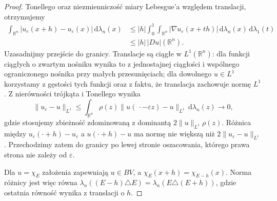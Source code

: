 \begin{proof}
Tonellego oraz niezmienniczość miary Lebesgue'a
względem translacji, otrzymujemy
\begin{align*}
 \int_{\mathbb R^n}|u_\varepsilon(x+h)-u_\varepsilon(x)|
 \,\mathrm d\lambda_n(x)
 &\le |h|\int_0^1\int_{\mathbb R^n}
 |\nabla u_\varepsilon(x+th)|\,\mathrm d\lambda_n(x)
 \,\mathrm d\lambda_1(t)\\
 &\le |h|\,|Du|(\mathbb R^n).
\end{align*}
Uzasadnijmy przejście do granicy.
Translacje są ciągłe w $L^1(\mathbb R^n)$: dla
funkcji ciągłych o zwartym nośniku wynika to
z jednostajnej ciągłości i wspólnego ograniczonego
nośnika przy małych przesunięciach; dla dowolnego
$u\in L^1$ korzystamy z gęstości tych funkcji
oraz z faktu, że translacja zachowuje normę $L^1$.
Z nierówności trójkąta i Tonellego wynika
\[
 \|u_\varepsilon-u\|_{L^1}
 \le\int_{\mathbb R^n}\rho(z)
 \|u(\,\cdot-\varepsilon z)-u\|_{L^1}\,\mathrm d\lambda_n(z)
 \longrightarrow0,
\]
gdzie stosujemy zbieżność zdominowaną z dominantą
$2\|u\|_{L^1}\rho(z)$.
Różnica między $u_\varepsilon(\cdot+h)-u_\varepsilon$
a $u(\cdot+h)-u$ ma normę nie większą niż
$2\|u_\varepsilon-u\|_{L^1}$. Przechodzimy zatem
do granicy po lewej stronie oszacowania, którego
prawa strona nie zależy od $\varepsilon$.

Dla $u=\chi_E$ założenia zapewniają $u\in BV$,
a $\chi_E(x+h)=\chi_{E-h}(x)$.
Norma różnicy jest więc równa
$\lambda_n((E-h)\triangle E)=
\lambda_n(E\triangle(E+h))$,
gdzie ostatnia równość wynika z translacji o $h$.
\end{proof}

